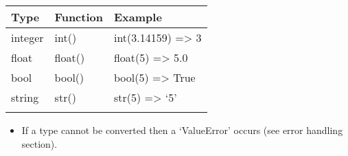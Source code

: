 \documentclass[letterpaper,10pt,english,openany]{sphinxmanual}
\begin{document}
\begin{savenotes}\sphinxattablestart
\centering
\begin{tabulary}{\linewidth}[t]{|T|T|T|}
\hline

Type
&
Function
&
Example
\\
\hline
integer
&
int()
&
int(3.14159) =\textgreater{} 3
\\
\hline
float
&
float()
&
float(5) =\textgreater{} 5.0
\\
\hline
bool
&
bool()
&
bool(5) =\textgreater{} True
\\
\hline
string
&
str()
&
str(5) =\textgreater{} ‘5’
\\
\hline&&\\
\hline
\end{tabulary}
\par
\sphinxattableend\end{savenotes}
\begin{itemize}
\item {} 
If a type cannot be converted then a ‘ValueError’ occurs (see error
handling section).

\end{itemize}

 
\end{document}
